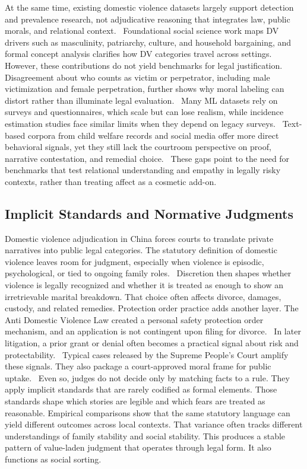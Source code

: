 {{{At the same time, existing domestic violence datasets largely support detection and prevalence research, not adjudicative reasoning that integrates law, public morals, and relational context.~\cite{ref52} Foundational social science work maps DV drivers such as masculinity, patriarchy, culture, and household bargaining, and formal concept analysis clarifies how DV categories travel across settings. However, these contributions do not yield benchmarks for legal justification.~\cite{ref53} Disagreement about who counts as victim or perpetrator, including male victimization and female perpetration, further shows why moral labeling can distort rather than illuminate legal evaluation.~\cite{ref54} Many ML datasets rely on surveys and questionnaires, which scale but can lose realism, while incidence estimation studies face similar limits when they depend on legacy surveys.~\cite{ref55} Text-based corpora from child welfare records and social media offer more direct behavioral signals, yet they still lack the courtroom perspective on proof, narrative contestation, and remedial choice.~\cite{ref56} These gaps point to the need for benchmarks that test relational understanding and empathy in legally risky contexts, rather than treating affect as a cosmetic add-on.

\hypertarget{implicit-standards-and-normative-judgments}{%
\subsection{Implicit Standards and Normative Judgments}\label{implicit-standards-and-normative-judgments}

Domestic violence adjudication in China forces courts to translate private narratives into public legal categories. The statutory definition of domestic violence leaves room for judgment, especially when violence is episodic, psychological, or tied to ongoing family roles.~\cite{ref57} Discretion then shapes whether violence is legally recognized and whether it is treated as enough to show an irretrievable marital breakdown. That choice often affects divorce, damages, custody, and related remedies. Protection order practice adds another layer. The Anti Domestic Violence Law created a personal safety protection order mechanism, and an application is not contingent upon filing for divorce.~\cite{ref58} In later litigation, a prior grant or denial often becomes a practical signal about risk and protectability.~\cite{ref59} Typical cases released by the Supreme People's Court amplify these signals. They also package a court-approved moral frame for public uptake.~\cite{ref60} Even so, judges do not decide only by matching facts to a rule. They apply implicit standards that are rarely codified as formal elements. Those standards shape which stories are legible and which fears are treated as reasonable. Empirical comparisons show that the same statutory language can yield different outcomes across local contexts. That variance often tracks different understandings of family stability and social stability. This produces a stable pattern of value-laden judgment that operates through legal form. It also functions as social sorting.~\cite{ref61}

}}}}
